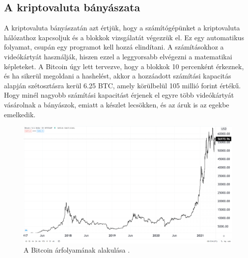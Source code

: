 \subsection{A kriptovaluta bányászata}
A kriptovaluta bányászatán azt értjük, hogy a számítógépünket a kriptovaluta hálózathoz kapcsoljuk és a blokkok vizsgálatát végezzük el. Ez egy automatikus folyamat, csupán egy programot kell hozzá elindítani. A számításokhoz a videókártyát használják, hiszen ezzel a leggyorsabb elvégezni a matematikai képleteket. A Bitcoin úgy lett tervezve, hogy a blokkok 10 percenként érkeznek, és ha sikerül megoldani a hashelést, akkor a hozzáadott számítási kapacitás alapján szétosztásra kerül 6.25 BTC, amely körülbelül 105 millió forint értékű. Hogy minél nagyobb számítási kapacitást érjenek el egyre több videókártyát vásárolnak a bányászok, emiatt a készlet lecsökken, és az áruk is az egekbe emelkedik.

\begin{figure}[ht]
\centering
\includegraphics[width=\textwidth]{images/BTC.png}
\caption{A Bitcoin árfolyamának alakulása \cite{Tradingview}.}
\label{fig:BTC}
\end{figure} 